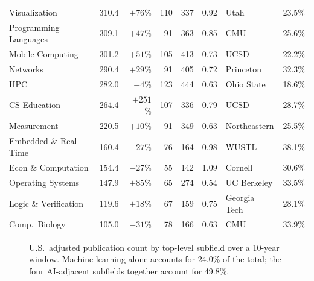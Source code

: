 \documentclass[11pt]{article}
\begin{document}
\begin{table}[p]
\begin{tabular}{lrrrrrlr}
Visualization         & 310.4  & $+76$\%  & 110 & 337  & 0.92 & Utah         & 23.5\% \\
Programming Languages & 309.1  & $+47$\%  & 91  & 363  & 0.85 & CMU          & 25.6\% \\
Mobile Computing      & 301.2  & $+51$\%  & 105 & 413  & 0.73 & UCSD         & 22.2\% \\
Networks              & 290.4  & $+29$\%  & 91  & 405  & 0.72 & Princeton    & 32.3\% \\
HPC                   & 282.0  & $-4$\%   & 123 & 444  & 0.63 & Ohio State   & 18.6\% \\
CS Education          & 264.4  & $+251$\% & 107 & 336  & 0.79 & UCSD         & 28.7\% \\
Measurement           & 220.5  & $+10$\%  & 91  & 349  & 0.63 & Northeastern & 25.5\% \\
Embedded \& Real-Time & 160.4  & $-27$\%  & 76  & 164  & 0.98 & WUSTL        & 38.1\% \\
Econ \& Computation   & 154.4  & $-27$\%  & 55  & 142  & 1.09 & Cornell      & 30.6\% \\
Operating Systems     & 147.9  & $+85$\%  & 65  & 274  & 0.54 & UC Berkeley  & 33.5\% \\
Logic \& Verification & 119.6  & $+18$\%  & 67  & 159  & 0.75 & Georgia Tech & 28.1\% \\
Comp.\ Biology        & 105.0  & $-31$\%  & 78  & 166  & 0.63 & CMU          & 33.9\% \\
\bottomrule
\end{tabular}
\end{table}

\begin{figure}[t]
\centering
{}
\caption{U.S.\ adjusted publication count by top-level subfield over a 10-year
window. Machine learning alone accounts for 24.0\% of the total; the four
AI-adjacent subfields together account for 49.8\%.}
\label{fig:fields}
\end{figure}
\end{document}
